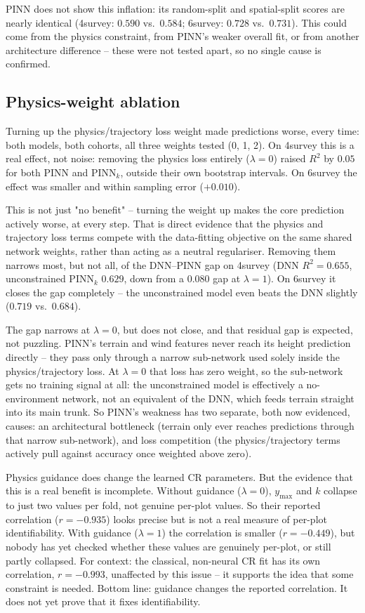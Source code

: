 PINN does not show this inflation: its random-split and spatial-split scores are nearly identical
(4survey: $0.590$ vs.\ $0.584$; 6survey: $0.728$ vs.\ $0.731$). This could come from the physics
constraint, from PINN's weaker overall fit, or from another architecture difference -- these were
not tested apart, so no single cause is confirmed.


\subsection{Physics-weight ablation}

Turning up the physics/trajectory loss weight made predictions worse, every time: both models,
both cohorts, all three weights tested (0, 1, 2). On 4survey this is a real effect, not noise:
removing the physics loss entirely ($\lambda=0$) raised $R^2$ by $0.05$ for both PINN and
PINN$_k$, outside their own bootstrap intervals. On 6survey the effect was smaller and within
sampling error ($+0.010$).

This is not just "no benefit" -- turning the weight up makes the core prediction actively worse,
at every step. That is direct evidence that the physics and trajectory loss terms compete with the
data-fitting objective on the same shared network weights, rather than acting as a neutral
regulariser. Removing them narrows most, but not all, of the DNN--PINN gap on 4survey (DNN
$R^2=0.655$, unconstrained PINN$_k$ $0.629$, down from a $0.080$ gap at $\lambda=1$). On 6survey it
closes the gap completely -- the unconstrained model even beats the DNN slightly ($0.719$ vs.\
$0.684$).

The gap narrows at $\lambda=0$, but does not close, and that residual gap is expected, not
puzzling. PINN's terrain and wind features never reach its height prediction directly -- they pass
only through a narrow sub-network used solely inside the physics/trajectory loss. At $\lambda=0$
that loss has zero weight, so the sub-network gets no training signal at all: the unconstrained
model is effectively a no-environment network, not an equivalent of the DNN, which feeds terrain
straight into its main trunk. So PINN's weakness has two separate, both now evidenced, causes: an
architectural bottleneck (terrain only ever reaches predictions through that narrow sub-network),
and loss competition (the physics/trajectory terms actively pull against accuracy once weighted
above zero).

Physics guidance does change the learned CR parameters. But the evidence that this is a real
benefit is incomplete. Without guidance ($\lambda=0$), $y_{\max}$ and $k$ collapse to just two
values per fold, not genuine per-plot values. So their reported correlation ($r=-0.935$) looks
precise but is not a real measure of per-plot identifiability. With guidance ($\lambda=1$) the
correlation is smaller ($r=-0.449$), but nobody has yet checked whether these values are genuinely
per-plot, or still partly collapsed. For context: the classical, non-neural CR fit has its own
correlation, $r=-0.993$, unaffected by this issue -- it supports the idea that some constraint is
needed. Bottom line: guidance changes the reported correlation. It does not yet prove that it
fixes identifiability.

